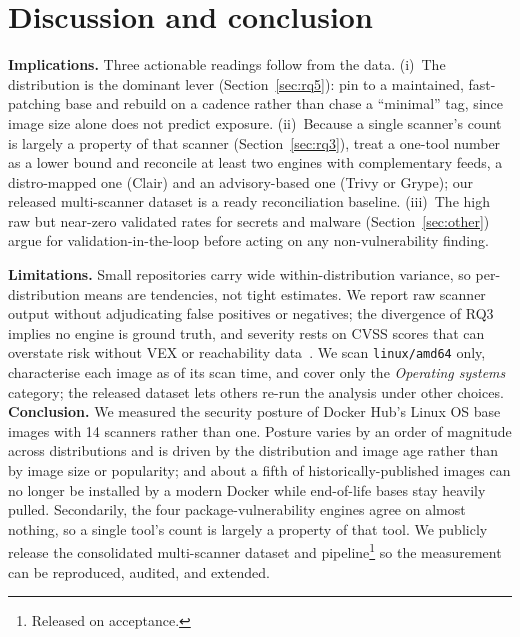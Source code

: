 \documentclass[12pt]{article}
\begin{document}
\section{Discussion and conclusion}
\label{sec:conclusion}
\textbf{Implications.} Three actionable readings follow from the data. (i)~The
distribution is the dominant lever (Section~\ref{sec:rq5}): pin to a maintained,
fast-patching base and rebuild on a cadence rather than chase a ``minimal'' tag,
since image size alone does not predict exposure. (ii)~Because a single scanner's
count is largely a property of that scanner (Section~\ref{sec:rq3}), treat a
one-tool number as a lower bound and reconcile at least two engines with
complementary feeds, a distro-mapped one (Clair) and an advisory-based one
(Trivy or Grype); our released multi-scanner dataset is a ready reconciliation
baseline. (iii)~The high raw but near-zero validated rates for secrets and
malware (Section~\ref{sec:other}) argue for validation-in-the-loop before acting
on any non-vulnerability finding.

\textbf{Limitations.} Small repositories carry wide within-distribution
variance, so per-distribution means are tendencies, not tight estimates.
We report raw scanner output without adjudicating false positives or negatives;
the divergence of RQ3 implies no engine is ground truth, and severity rests on
CVSS scores that can overstate risk without VEX or reachability
data~\cite{zhou2026realitycheck}. We scan \texttt{linux/amd64} only, characterise
each image as of its scan time, and cover only the \emph{Operating systems}
category; the released dataset lets others re-run the analysis under other
choices.
\textbf{Conclusion.} We measured the security posture of Docker Hub's Linux OS
base images with 14 scanners rather than one. Posture varies by an order of
magnitude across distributions and is driven by the distribution and image age rather than by image size or
popularity; and about a fifth of historically-published images can no longer
be installed by a modern Docker while end-of-life bases stay heavily pulled.
Secondarily, the four package-vulnerability engines agree on almost nothing, so
a single tool's count is largely a property of that tool. We publicly release
the consolidated multi-scanner dataset and pipeline\footnote{Released on
acceptance.} so the measurement can be reproduced, audited, and extended.



\end{document}
